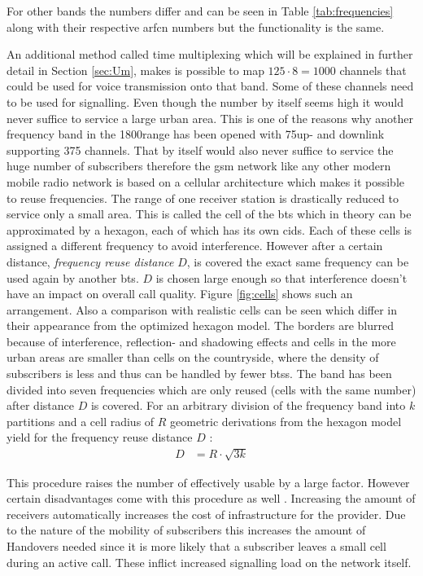 For other bands the numbers differ and can be seen in Table \ref{tab:frequencies} along with their respective \gls{arfcn} numbers but the functionality is the same.

An additional method called time multiplexing which will be explained in further detail in Section \ref{sec:Um}, makes is possible to map $125 \cdot 8 = 1000$ channels that could be used for voice transmission onto that band.
Some of these channels need to be used for signalling.
Even though the number by itself seems high it would never suffice to service a large urban area.
This is one of the reasons why another frequency band in the 1800\MHz range has been opened with 75\MHz up- and downlink supporting 375 channels.
That by itself would also never suffice to service the huge number of subscribers therefore the \gls{gsm} network like any other modern mobile radio network is based on a cellular architecture which makes it possible to reuse frequencies.
The range of one receiver station is drastically reduced to service only a small area.
This is called the cell of the \gls{bts} which in theory can be approximated by a hexagon, each of which has its own \glspl{cid}.
Each of these cells is assigned a different frequency to avoid interference.
However after a certain distance, \emph{frequency reuse distance} $D$, is covered the exact same frequency can be used again by another \gls{bts}.
$D$ is chosen large enough so that interference doesn't have an impact on overall call quality.
Figure \ref{fig:cells} shows such an arrangement.
Also a comparison with realistic cells can be seen which differ in their appearance from the optimized hexagon model.
The borders are blurred because of interference, reflection- and shadowing effects and cells in the more urban areas are smaller than cells on the countryside, where the density of subscribers is less and thus can be handled by fewer \glspl{bts}.
The band has been divided into seven frequencies which are only reused (cells with the same number) after distance $D$ is covered.
For an arbitrary division of the frequency band into $k$ partitions and a cell radius of $R$ geometric derivations from the hexagon model yield for the frequency reuse distance $D$ \cite{GSM2009}:
\begin{align}
D	&=R\cdot\sqrt{3k}
\end{align}

This procedure raises the number of effectively usable by a large factor.
However certain disadvantages come with this procedure as well \cite{protocols1999}.
Increasing the amount of receivers automatically increases the cost of infrastructure for the provider.
Due to the nature of the mobility of subscribers this increases the amount of Handovers needed since it is more likely that a subscriber leaves a small cell during an active call.
These inflict increased signalling load on the network itself.


